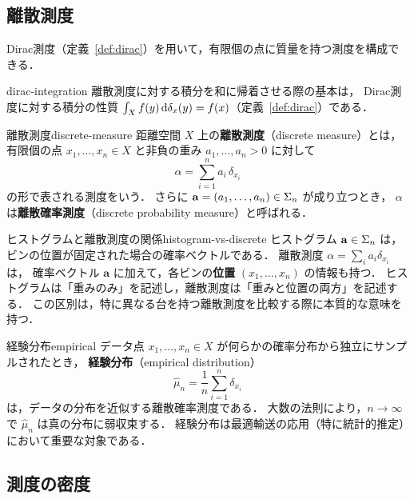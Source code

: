 \subsection{離散測度}
\label{subsec:discrete-measures}

Dirac測度（定義~\ref{def:dirac}）を用いて，有限個の点に質量を持つ測度を構成できる．

\begin{remark}{}{dirac-integration}
  離散測度に対する積分を和に帰着させる際の基本は，
  Dirac測度に対する積分の性質
  $\int_X f(y) \, \mathrm{d}\delta_x(y) = f(x)$（定義~\ref{def:dirac}）である．
\end{remark}

\begin{definition}{離散測度}{discrete-measure}
  距離空間 $X$ 上の\textbf{離散測度}（discrete measure）とは，
  有限個の点 $x_1, \ldots, x_n \in X$ と非負の重み $a_1, \ldots, a_n > 0$ に対して
  \[
    \alpha = \sum_{i=1}^n a_i \, \delta_{x_i}
  \]
  の形で表される測度をいう．
  さらに $\mathbf{a} = (a_1, \ldots, a_n) \in \Sigma_n$ が成り立つとき，
  $\alpha$ は\textbf{離散確率測度}（discrete probability measure）と呼ばれる．
\end{definition}

\begin{remark}{ヒストグラムと離散測度の関係}{histogram-vs-discrete}
  ヒストグラム $\mathbf{a} \in \Sigma_n$ は，ビンの位置が固定された場合の確率ベクトルである．
  離散測度 $\alpha = \sum_i a_i \delta_{x_i}$ は，
  確率ベクトル $\mathbf{a}$ に加えて，各ビンの\textbf{位置} $(x_1, \ldots, x_n)$ の情報も持つ．
  ヒストグラムは「重みのみ」を記述し，離散測度は「重みと位置の両方」を記述する．
  この区別は，特に異なる台を持つ離散測度を比較する際に本質的な意味を持つ．
\end{remark}

\begin{example}{経験分布}{empirical}
  データ点 $x_1, \ldots, x_n \in X$ が何らかの確率分布から独立にサンプルされたとき，
  \textbf{経験分布}（empirical distribution）
  \[
    \hat{\mu}_n = \frac{1}{n} \sum_{i=1}^n \delta_{x_i}
  \]
  は，データの分布を近似する離散確率測度である．
  大数の法則により，$n \to \infty$ で $\hat{\mu}_n$ は真の分布に弱収束する．
  経験分布は最適輸送の応用（特に統計的推定）において重要な対象である．
\end{example}

\subsection{測度の密度}
\label{subsec:density}

